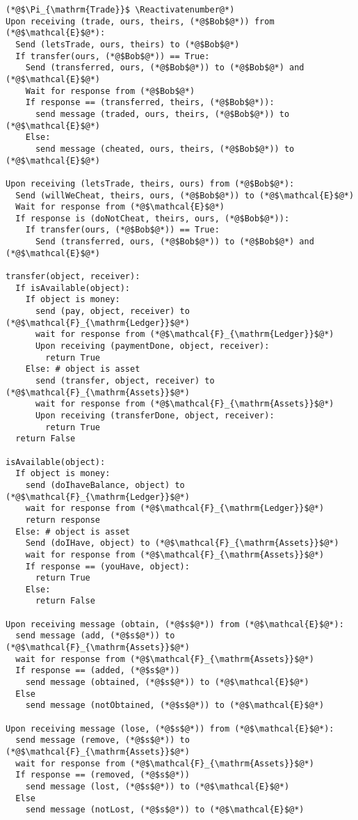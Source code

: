 \Suppressnumber
\begin{lstlisting}[label=tradeprot, style=numbers]
(*@$\Pi_{\mathrm{Trade}}$ \Reactivatenumber@*)
Upon receiving (trade, ours, theirs, (*@$Bob$@*)) from (*@$\mathcal{E}$@*):
  Send (letsTrade, ours, theirs) to (*@$Bob$@*)
  If transfer(ours, (*@$Bob$@*)) == True:
    Send (transferred, ours, (*@$Bob$@*)) to (*@$Bob$@*) and (*@$\mathcal{E}$@*)
    Wait for response from (*@$Bob$@*)
    If response == (transferred, theirs, (*@$Bob$@*)):
      send message (traded, ours, theirs, (*@$Bob$@*)) to (*@$\mathcal{E}$@*)
    Else:
      send message (cheated, ours, theirs, (*@$Bob$@*)) to (*@$\mathcal{E}$@*)

Upon receiving (letsTrade, theirs, ours) from (*@$Bob$@*):
  Send (willWeCheat, theirs, ours, (*@$Bob$@*)) to (*@$\mathcal{E}$@*)
  Wait for response from (*@$\mathcal{E}$@*)
  If response is (doNotCheat, theirs, ours, (*@$Bob$@*)):
    If transfer(ours, (*@$Bob$@*)) == True:
      Send (transferred, ours, (*@$Bob$@*)) to (*@$Bob$@*) and (*@$\mathcal{E}$@*)

transfer(object, receiver):
  If isAvailable(object):
    If object is money:
      send (pay, object, receiver) to (*@$\mathcal{F}_{\mathrm{Ledger}}$@*)
      wait for response from (*@$\mathcal{F}_{\mathrm{Ledger}}$@*)
      Upon receiving (paymentDone, object, receiver):
        return True
    Else: # object is asset
      send (transfer, object, receiver) to (*@$\mathcal{F}_{\mathrm{Assets}}$@*)
      wait for response from (*@$\mathcal{F}_{\mathrm{Assets}}$@*)
      Upon receiving (transferDone, object, receiver):
        return True
  return False

isAvailable(object):
  If object is money:
    send (doIhaveBalance, object) to (*@$\mathcal{F}_{\mathrm{Ledger}}$@*)
    wait for response from (*@$\mathcal{F}_{\mathrm{Ledger}}$@*)
    return response
  Else: # object is asset
    Send (doIHave, object) to (*@$\mathcal{F}_{\mathrm{Assets}}$@*)
    wait for response from (*@$\mathcal{F}_{\mathrm{Assets}}$@*)
    If response == (youHave, object):
      return True
    Else:
      return False

Upon receiving message (obtain, (*@$s$@*)) from (*@$\mathcal{E}$@*):
  send message (add, (*@$s$@*)) to (*@$\mathcal{F}_{\mathrm{Assets}}$@*)
  wait for response from (*@$\mathcal{F}_{\mathrm{Assets}}$@*)
  If response == (added, (*@$s$@*))
    send message (obtained, (*@$s$@*)) to (*@$\mathcal{E}$@*)
  Else
    send message (notObtained, (*@$s$@*)) to (*@$\mathcal{E}$@*)

Upon receiving message (lose, (*@$s$@*)) from (*@$\mathcal{E}$@*):
  send message (remove, (*@$s$@*)) to (*@$\mathcal{F}_{\mathrm{Assets}}$@*)
  wait for response from (*@$\mathcal{F}_{\mathrm{Assets}}$@*)
  If response == (removed, (*@$s$@*))
    send message (lost, (*@$s$@*)) to (*@$\mathcal{E}$@*)
  Else
    send message (notLost, (*@$s$@*)) to (*@$\mathcal{E}$@*)
\end{lstlisting}
